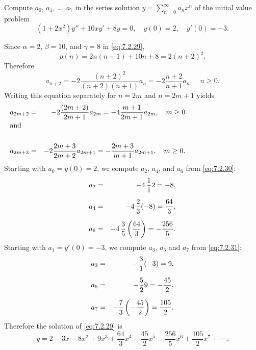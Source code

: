 \setcounter{example}{3}
\setcounter{equation}{28}
\begin{example}
  \label{example:7.2.4}\rm Compute $a_{0}$, $a_{1}$, \dots, $a_{7}$ in the series solution
  $y=\sum_{n=0}^{\infty}a_{n}x^{n}$ of the initial value problem
  \begin{equation}
    \label{eq:7.2.29}(1+2x^{2})y''+10xy'+8y=0,\quad y(0)=2,\quad y'(0)=-3.
  \end{equation}
\end{example}
\setcounter{equation}{29}
\begin{examplesolution}
\solution Since $\alpha=2$, $\beta=10$, and $\gamma=8$ in \eqref{eq:7.2.29},
\[
  p(n)=2n(n-1)+10n+8=2(n+2)^{2}.
\]
Therefore
\[
  a_{n+2}=-2{\frac{(n+2)^{2}}{(n+2)(n+1)}}a_{n}=-2{\frac{n+2}{n+1}}a_{n},\quad n\ge0.
\]
Writing this equation separately for $n=2m$ and $n=2m+1$ yields
\begin{eqnarray}
  a_{2m+2}                                     & = & -2{\frac{(2m+2)}{2m+1}}a_{2m}=-4{\frac{m+1}{2m+1}}a_{2m},\quad m\ge0\label{eq:7.2.30} \\
  \noalign{\hspace*{-15pt}\mbox{and}}\nonumber                                                                                             \\
  a_{2m+3}                                     & = & -2{\frac{2m+3}{2m+2}}a_{2m+1}=-\frac{2m+3}{m+1}a_{2m+1},\quad m\ge0.\label{eq:7.2.31}
\end{eqnarray}
Starting with $a_{0}=y(0)=2$, we compute $a_{2}$, $a_{4}$, and $a_{6}$ from \eqref{eq:7.2.30}:
\begin{eqnarray*}
  a_{2} & = & -4\,\frac{1}{1}2=-8,              \\[2\jot]
  a_{4} & = & -4\,\frac{2}{3}(-8)=\frac{64}{3}, \\[2\jot]
  a_{6} & = & -4\,\frac{3}{5}\left(\frac{64}{3}\right)=-\frac{256}{5}.
\end{eqnarray*}
Starting with $a_{1}=y'(0)=-3$, we compute $a_{3}$, $a_{5}$ and $a_{7}$ from \eqref{eq:7.2.31}:
\begin{eqnarray*}
  a_{3} & = & -\frac{3}{1}(-3)=9,          \\[2\jot]
  a_{5} & = & -\frac{5}{2}9=-\frac{45}{2}, \\[2\jot]
  a_{7} & = & -\frac{7}{3}\left(-\frac{45}{2}\right)=\frac{105}{2}.
\end{eqnarray*}
Therefore the solution of \eqref{eq:7.2.29} is
\[
  y=2-3x-8x^{2}+9x^{3}+\frac{64}{3}x^{4}-\frac{45}{2}x^{5}-\frac{256}{5}x^{6}+\frac{105}{2}x^{7}+\cdots\;.
\]
\end{examplesolution}

